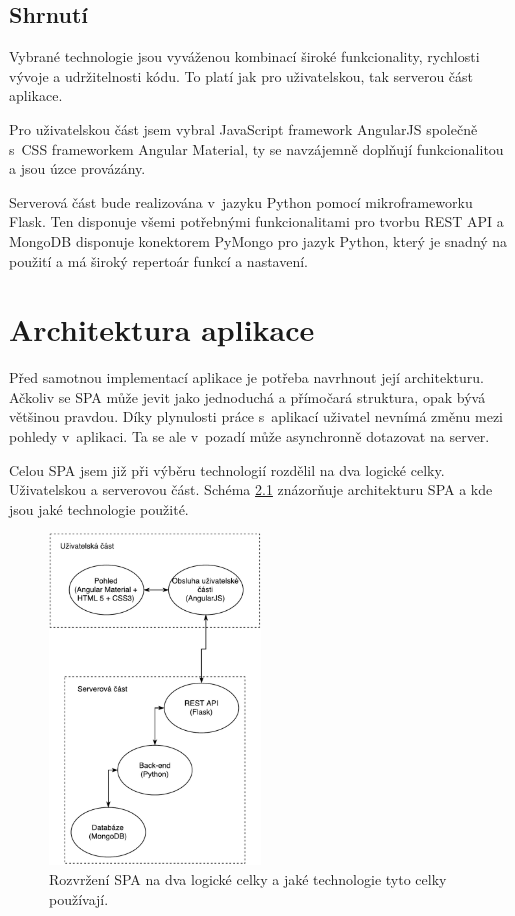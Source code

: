 \section{Shrnutí}

Vybrané technologie jsou vyváženou kombinací široké funkcionality, rychlosti vývoje a udržitelnosti kódu. To platí jak pro uživatelskou, tak serverou část aplikace.

Pro uživatelskou část jsem vybral JavaScript framework AngularJS společně s~CSS frameworkem Angular Material, ty se navzájemně doplňují funkcionalitou a jsou úzce provázány.

Serverová část bude realizována v~jazyku Python pomocí mikroframeworku Flask. Ten disponuje všemi potřebnými funkcionalitami pro tvorbu REST API a MongoDB disponuje konektorem PyMongo pro jazyk Python, který je snadný na použití a má široký repertoár funkcí a nastavení.

\chapter{Architektura aplikace}
\label{architektura}

Před samotnou implementací aplikace je potřeba navrhnout její architekturu. Ačkoliv se SPA může jevit jako jednoduchá a přímočará struktura, opak bývá většinou pravdou. Díky plynulosti práce s~aplikací uživatel nevnímá změnu mezi pohledy v~aplikaci. Ta se ale v~pozadí může asynchronně dotazovat na server.

Celou SPA jsem již při výběru technologií rozdělil na dva logické celky. Uživatelskou a serverovou část. Schéma \ref{fig:system} znázorňuje architekturu SPA a kde jsou jaké technologie použité.

\begin{figure}[ht]
    \centering
    \includegraphics[width=0.5\textwidth]{fig/SPA.pdf}
    \caption{Rozvržení SPA na dva logické celky a jaké technologie tyto celky používají.} \label{fig:system}
\end{figure}

